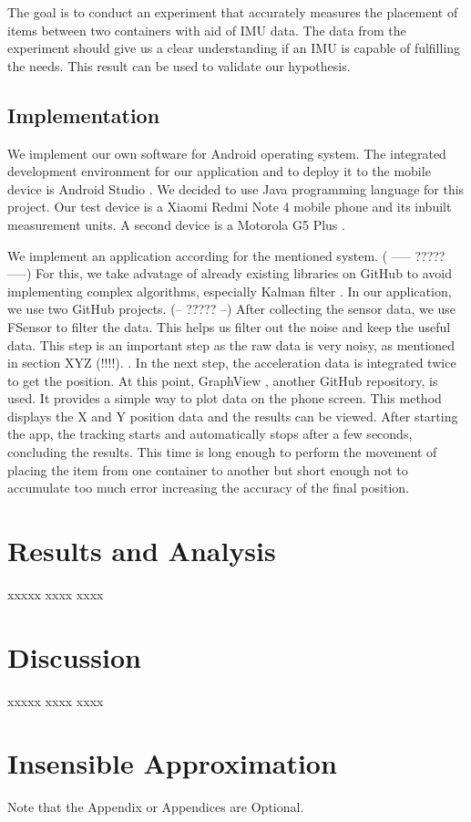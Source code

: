 \documentclass[12pt,twoside, hidelinks]{article}
\begin{document}
The goal is to conduct an experiment that accurately measures the placement of items between two containers with aid of IMU data. The data from the experiment should give us a clear understanding if an IMU is capable of fulfilling the needs. This result can be used to validate our hypothesis.



\subsection{Implementation}
\label{sect:implementation}
We implement our own software for Android operating system\cite{Android}. The integrated development environment for our application and to deploy it to the mobile device is Android Studio \cite{Android_Studio} . We decided to use Java programming language \cite{Java} for this project. Our test device is a Xiaomi Redmi Note 4 mobile phone \cite{Redmi_Note4} and its inbuilt measurement units. A second device is a Motorola G5 Plus \cite{motoG5}.

We implement an application according for the mentioned system. ( ----- ????? -----) For this, we  take advatage of already existing libraries on GitHub to avoid implementing complex algorithms, especially Kalman filter \cite{Kalman_filter_book}. In our application, we use two GitHub \cite{github} projects. (-- ????? --) After collecting the sensor data, we use FSensor \cite{KalebKE_2018} to filter the data. This helps us filter out the noise and keep the useful data. This step is an important step as the raw data is very noisy, as mentioned in section XYZ (!!!!). . In the next step, the acceleration data is integrated twice to get the position. At this point, GraphView \cite{Graphview}, another GitHub repository, is used. It provides a simple way to plot data on the phone screen. This method displays the X and Y position data and the results can be viewed. After starting the app, the tracking starts and automatically stops after a few seconds, concluding the results. This time is long enough to perform the movement of placing the item from one container to another but short enough not to accumulate too much error increasing the accuracy of the final position.

\section{Results and Analysis}
\label{sec:results}

xxxxx xxxx xxxx 

\section{Discussion}
\label{sec:discussion}
xxxxx xxxx xxxx 



\appendix
\section{Insensible Approximation}

Note that the Appendix or Appendices are Optional.
\end{document}
